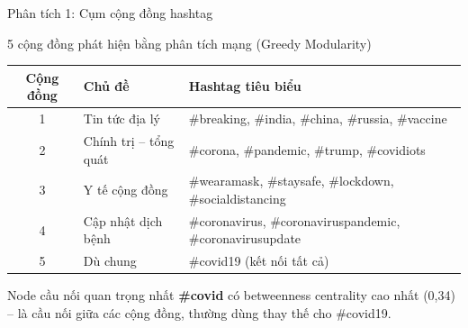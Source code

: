 \documentclass[aspectratio=169]{beamer}
\begin{document}
\begin{frame}{Phân tích 1: Cụm cộng đồng hashtag}
  \begin{block}{5 cộng đồng phát hiện bằng phân tích mạng (Greedy Modularity)}
    \centering
    \begin{tabular}{clp{6cm}}
      \toprule
      \textbf{Cộng đồng} & \textbf{Chủ đề} & \textbf{Hashtag tiêu biểu} \\
      \midrule
      1 & Tin tức địa lý   & \#breaking, \#india, \#china, \#russia, \#vaccine \\
      2 & Chính trị -- tổng quát & \#corona, \#pandemic, \#trump, \#covidiots \\
      3 & Y tế cộng đồng   & \#wearamask, \#staysafe, \#lockdown, \#socialdistancing \\
      4 & Cập nhật dịch bệnh & \#coronavirus, \#coronaviruspandemic, \#coronavirusupdate \\
      5 & Dù chung         & \#covid19 (kết nối tất cả) \\
      \bottomrule
    \end{tabular}
  \end{block}

  \vspace{0.4em}
  \begin{alertblock}{Node cầu nối quan trọng nhất}
    \textbf{\#covid} có betweenness centrality cao nhất (0,34) -- là cầu nối giữa các cộng đồng, thường dùng thay thế cho \#covid19.
  \end{alertblock}
\end{frame}
\end{document}
